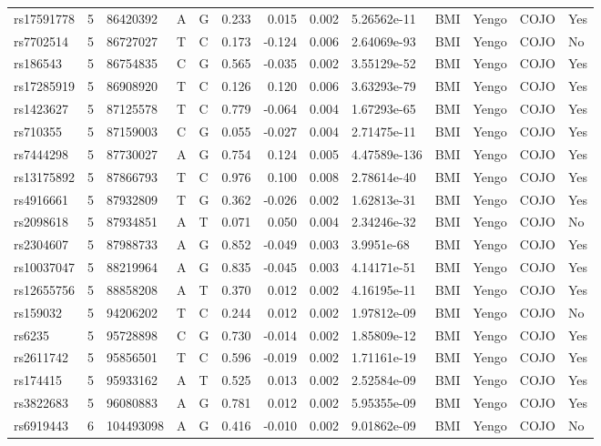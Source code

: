 \documentclass[11pt,twoside]{bristolthesis}
\begin{document}
\begin{longtable}[t]{lrlllrrrlllll}
rs17591778 & 5 & 86420392 & A & G & 0.233 & 0.015 & 0.002 & 5.26562e-11 & BMI & Yengo & COJO & Yes\\
rs7702514 & 5 & 86727027 & T & C & 0.173 & -0.124 & 0.006 & 2.64069e-93 & BMI & Yengo & COJO & No\\
rs186543 & 5 & 86754835 & C & G & 0.565 & -0.035 & 0.002 & 3.55129e-52 & BMI & Yengo & COJO & Yes\\
rs17285919 & 5 & 86908920 & T & C & 0.126 & 0.120 & 0.006 & 3.63293e-79 & BMI & Yengo & COJO & Yes\\
\addlinespace
rs1423627 & 5 & 87125578 & T & C & 0.779 & -0.064 & 0.004 & 1.67293e-65 & BMI & Yengo & COJO & Yes\\
rs710355 & 5 & 87159003 & C & G & 0.055 & -0.027 & 0.004 & 2.71475e-11 & BMI & Yengo & COJO & Yes\\
rs7444298 & 5 & 87730027 & A & G & 0.754 & 0.124 & 0.005 & 4.47589e-136 & BMI & Yengo & COJO & Yes\\
rs13175892 & 5 & 87866793 & T & C & 0.976 & 0.100 & 0.008 & 2.78614e-40 & BMI & Yengo & COJO & Yes\\
rs4916661 & 5 & 87932809 & T & G & 0.362 & -0.026 & 0.002 & 1.62813e-31 & BMI & Yengo & COJO & Yes\\
\addlinespace
rs2098618 & 5 & 87934851 & A & T & 0.071 & 0.050 & 0.004 & 2.34246e-32 & BMI & Yengo & COJO & No\\
rs2304607 & 5 & 87988733 & A & G & 0.852 & -0.049 & 0.003 & 3.9951e-68 & BMI & Yengo & COJO & Yes\\
rs10037047 & 5 & 88219964 & A & G & 0.835 & -0.045 & 0.003 & 4.14171e-51 & BMI & Yengo & COJO & Yes\\
rs12655756 & 5 & 88858208 & A & T & 0.370 & 0.012 & 0.002 & 4.16195e-11 & BMI & Yengo & COJO & Yes\\
rs159032 & 5 & 94206202 & T & C & 0.244 & 0.012 & 0.002 & 1.97812e-09 & BMI & Yengo & COJO & No\\
\addlinespace
rs6235 & 5 & 95728898 & C & G & 0.730 & -0.014 & 0.002 & 1.85809e-12 & BMI & Yengo & COJO & Yes\\
rs2611742 & 5 & 95856501 & T & C & 0.596 & -0.019 & 0.002 & 1.71161e-19 & BMI & Yengo & COJO & Yes\\
rs174415 & 5 & 95933162 & A & T & 0.525 & 0.013 & 0.002 & 2.52584e-09 & BMI & Yengo & COJO & Yes\\
rs3822683 & 5 & 96080883 & A & G & 0.781 & 0.012 & 0.002 & 5.95355e-09 & BMI & Yengo & COJO & Yes\\
rs6919443 & 6 & 104493098 & A & G & 0.416 & -0.010 & 0.002 & 9.01862e-09 & BMI & Yengo & COJO & No\\

\end{longtable}
\end{document}
